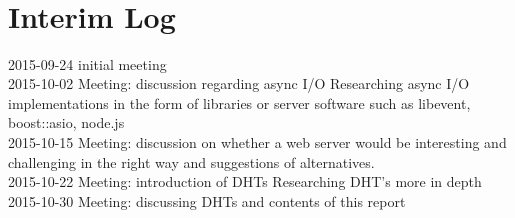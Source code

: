 \documentclass{article}
\begin{document}
\hspace*{-3cm}
\begin{ganttchart}{1}{22}
 \\

\\
 \\
 \\
 \\
 \\
 \\
 \\
 \\
 \\
 \\

\end{ganttchart}
\hspace*{-3cm}

\section{Interim Log}
2015-09-24 initial meeting\\
2015-10-02 Meeting: discussion regarding async I/O
	Researching async I/O implementations in the form of libraries or server software such as libevent, boost::asio, node.js\\
2015-10-15 Meeting: discussion on whether a web server would be interesting and challenging in the right way and suggestions of alternatives.\\
2015-10-22 Meeting: introduction of DHTs
	Researching DHT’s more in depth \\
2015-10-30 Meeting: discussing DHTs and contents of this report
\end{document}
